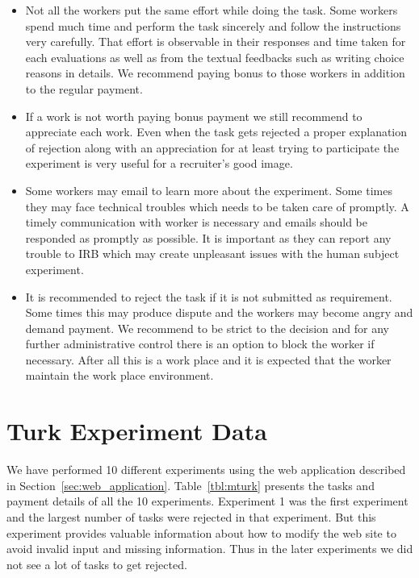 \documentclass[11pt]{article}
\begin{document}
\begin{itemize}

\item Not all the workers put the same effort while doing the task. Some workers spend much time and perform the task sincerely and follow the instructions very carefully. That effort is observable in their responses and time taken for each evaluations as well as from the textual feedbacks such as writing choice reasons in details. We recommend paying bonus to those workers in addition to the regular payment. 

\item If a work is not worth paying bonus payment we still recommend to appreciate each work. Even when the task gets rejected a proper explanation of rejection along with an appreciation for at least trying to participate the experiment is very useful for a recruiter's good image. 

\item Some workers may email to learn more about the experiment. Some times they may face technical troubles which needs to be taken care of promptly. A timely communication with worker is necessary and emails should be responded as  promptly as possible. It is important as they can report any trouble to IRB which may create unpleasant issues with the human subject experiment.

\item It is recommended to reject the task if it is not submitted as requirement. Some times this may produce dispute and the workers may become angry and demand payment. We recommend to be strict to the decision and for any further administrative control there is an option to block the worker if necessary. After all this is a work place and it is expected that the worker maintain the work place environment.

 \end{itemize}

\section{Turk Experiment Data} \label{sec:turk_data}

We have performed 10 different experiments using the web application described in Section~\ref{sec:web_application}. Table~\ref{tbl:mturk} presents the tasks and payment details of all the 10 experiments. Experiment 1 was the first experiment and the largest number of tasks were rejected in that experiment. But this experiment provides valuable information about how to modify the web site to avoid invalid input and missing information. Thus in the later experiments we did not see a lot of tasks to get rejected.
\end{document}
